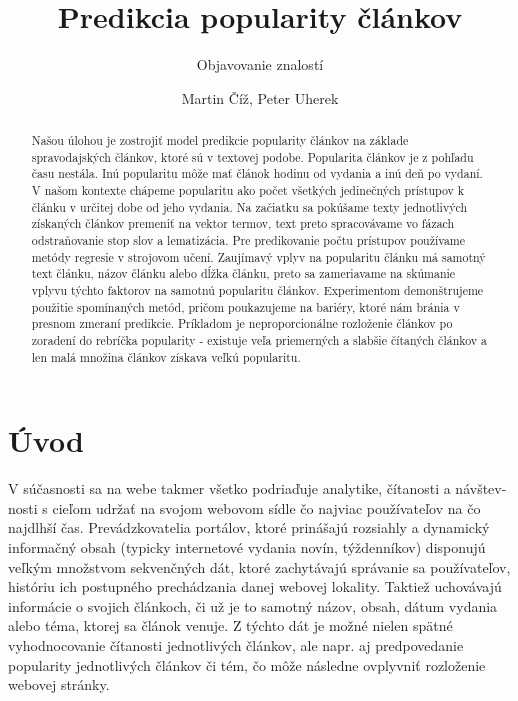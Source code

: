\documentclass[runningheads,a4paper]{llncs}
\begin{document}
\title{Predikcia popularity článkov}
\subtitle{Objavovanie znalostí}
\author{Martin Číž, Peter Uherek}
\maketitle
\begin{abstract}
  Našou úlohou je zostrojiť model predikcie popularity článkov na základe spravodajských článkov, ktoré sú v textovej podobe.
  Popularita článkov je z pohľadu času nestála. Inú popularitu môže mať článok hodinu od vydania a inú deň po vydaní.
  V našom kontexte chápeme popularitu ako počet všetkých jedinečných prístupov k článku v určitej dobe od jeho vydania.
  Na začiatku sa pokúšame texty jednotlivých získaných článkov premeniť na vektor termov, text preto spracovávame vo fázach odstraňovanie stop slov a lematizácia.
  Pre predikovanie počtu prístupov používame metódy regresie v strojovom učení.
  Zaujímavý vplyv na popularitu článku má samotný text článku, názov článku alebo dĺžka článku, preto sa zameriavame na skúmanie vplyvu týchto faktorov na samotnú popularitu článkov.
  Experimentom demonštrujeme použitie spomínaných metód, pričom poukazujeme na bariéry, ktoré nám bránia v presnom zmeraní predikcie.
  Príkladom je neproporcionálne rozloženie článkov po zoradení do rebríčka popularity - existuje veľa priemerných a slabšie čítaných článkov a len malá množina článkov získava veľkú popularitu.
\end{abstract}

\section{Úvod}
  V súčasnosti sa na webe takmer všetko podriaďuje analytike, čítanosti a 
návštev-nosti s cieľom udržať na svojom webovom sídle čo najviac používateľov na 
čo najdlhší čas. Prevádzkovatelia portálov, ktoré prinášajú rozsiahly a 
dynamický informačný obsah (typicky internetové vydania novín, týždenníkov) 
disponujú veľkým množstvom sekvenčných dát, ktoré zachytávajú správanie sa 
používateľov, históriu ich postupného prechádzania danej webovej lokality. 
Taktiež uchovávajú informácie o svojich článkoch, či už je to samotný názov, 
obsah, dátum vydania alebo téma, ktorej sa článok venuje. Z týchto dát je možné 
nielen spätné vyhodnocovanie čítanosti jednotlivých článkov, ale napr. aj 
predpovedanie popularity jednotlivých článkov či tém, čo môže následne ovplyvniť 
rozloženie webovej stránky. 
\end{document}
